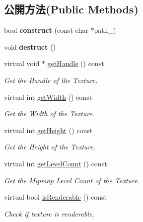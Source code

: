 \subsection*{公開方法(Public Methods)}
\begin{DoxyCompactItemize}
\item 
bool {\bfseries construct} (const char $\ast$path\+\_\+)\hypertarget{class_magnum_1_1_sprite_sheet_aec334317729f368603b6973fe2093719}{}\label{class_magnum_1_1_sprite_sheet_aec334317729f368603b6973fe2093719}

\item 
void {\bfseries destruct} ()\hypertarget{class_magnum_1_1_sprite_sheet_ac902373a404443f8d200dd3c3cc56e7c}{}\label{class_magnum_1_1_sprite_sheet_ac902373a404443f8d200dd3c3cc56e7c}

\item 
virtual void $\ast$ \hyperlink{class_magnum_1_1_sprite_sheet_ab6cd54156419571b16fe3f2271c11488}{get\+Handle} () const 
\begin{DoxyCompactList}\small\item\em Get the Handle of the Texture. \end{DoxyCompactList}\item 
virtual int \hyperlink{class_magnum_1_1_sprite_sheet_aa43930a60edba5b649350d2ad98a9b0c}{get\+Width} () const 
\begin{DoxyCompactList}\small\item\em Get the Width of the Texture. \end{DoxyCompactList}\item 
virtual int \hyperlink{class_magnum_1_1_sprite_sheet_a72648f274827c0ace93a24f3d9ac62ec}{get\+Height} () const 
\begin{DoxyCompactList}\small\item\em Get the Height of the Texture. \end{DoxyCompactList}\item 
virtual int \hyperlink{class_magnum_1_1_sprite_sheet_a2205caeee91443f55c464949ba125b68}{get\+Level\+Count} () const 
\begin{DoxyCompactList}\small\item\em Get the Mipmap Level Count of the Texture. \end{DoxyCompactList}\item 
virtual bool \hyperlink{class_magnum_1_1_sprite_sheet_a21a8d282da4e731ce42adb2dca75c2e1}{is\+Renderable} () const 
\begin{DoxyCompactList}\small\item\em Check if texture is renderable. \end{DoxyCompactList}\item 

\end{DoxyCompactItemize}
